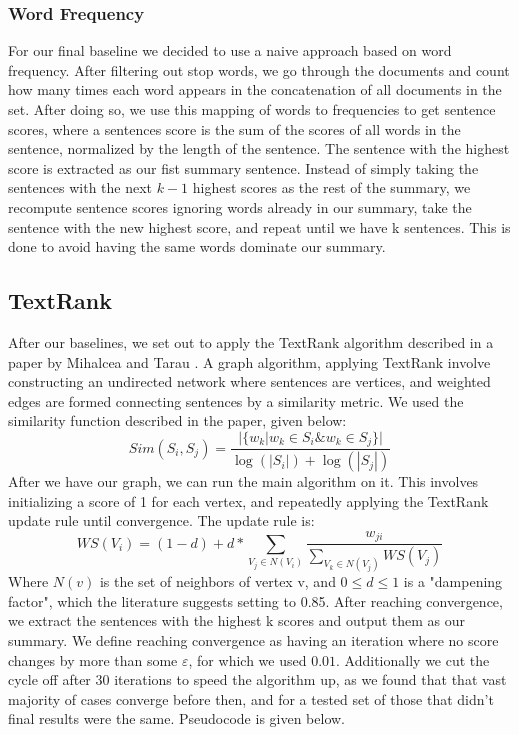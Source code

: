 \documentclass[11pt]{article}
\begin{document}
\subsubsection{Word Frequency}
For our final baseline we decided to use a naive approach based on word frequency. After filtering out stop words, we go through the documents and count how many times each word appears in the concatenation of all documents in the set. After doing so, we use this mapping of words to frequencies to get sentence scores, where a sentences score is the sum of the scores of all words in the sentence, normalized by the length of the sentence. The sentence with the highest score is extracted as our fist summary sentence. Instead of simply taking the sentences with the next $k-1$ highest scores as the rest of the summary, we recompute sentence scores ignoring words already in our summary, take the sentence with the new highest score, and repeat until we have k sentences. This is done to avoid having the same words dominate our summary.

\subsection{TextRank}
After our baselines, we set out to apply the TextRank algorithm described in a paper by Mihalcea and Tarau \cite{textrank}. A graph algorithm, applying TextRank involve constructing an undirected network where sentences are vertices, and weighted edges are formed connecting sentences by a similarity metric.
We used the similarity function described in the paper, given below:
$$Sim(S_i, S_j) = \frac{| \{ w_k | w_k \in S_i \& w_k \in S_j\}|}{\log(|S_i|) + \log(|S_j|)}$$
After we have our graph, we can run the main algorithm on it. This involves initializing a score of 1 for each vertex, and repeatedly applying the TextRank update rule until convergence. The update rule is:
$$ WS(V_i) = (1 - d) + d* \sum_{V_j \in N(V_i)} \frac{w_{ji}}{\sum_{V_k \in N(V_j)} WS(V_j)}$$
Where $N(v)$ is the set of neighbors of vertex v, and $0 \leqslant d \leqslant 1$ is a "dampening factor", which the literature suggests setting to 0.85. After reaching convergence, we extract the sentences with the highest k scores and output them as our summary.  We define reaching convergence as having an iteration where no score changes by more than some $\varepsilon$, for which we used $0.01$. Additionally we cut the cycle off after 30 iterations to speed the algorithm up, as we found that that vast majority of cases converge before then, and for a tested set of those that didn't final results were the same. Pseudocode is given below.
\end{document}
